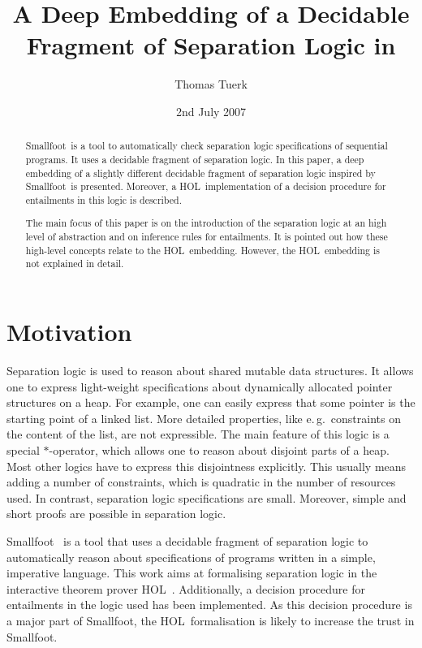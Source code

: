 \documentclass{scrartcl}
\title{A Deep Embedding of a Decidable Fragment of Separation Logic in \HOL}
\author{Thomas Tuerk}
\date{2nd July 2007}
\theoremstyle{definition}
\newcommand{\smallfoot}{{\sf Smallfoot}}
\newcommand{\HOL}{{\sf HOL}}
\begin{document}
\maketitle

\begin{abstract}
  \smallfoot\ is a tool to automatically check separation logic specifications
  of sequential programs. It uses a decidable fragment of separation logic. In
  this paper, a deep embedding of a slightly different decidable fragment of
  separation logic inspired by \smallfoot\ is presented. Moreover, a \HOL\ 
  implementation of a decision procedure for entailments in this logic is
  described.

  The main focus of this paper is on the introduction of the separation
  logic at an high level of abstraction and on inference rules for
  entailments. It is pointed out how these high-level concepts relate to
  the \HOL\ embedding. However, the \HOL\ embedding is not explained in detail.
\end{abstract}


\tableofcontents 


\section{Motivation}
Separation logic \cite{reynolds02separation} is used to reason about shared
mutable data structures. It allows one to express light-weight specifications
about dynamically allocated pointer structures on a heap. For example, one can
easily express that some pointer is the starting point of a linked list. More
detailed properties, like e.\,g.\ constraints on the content of the list, are
not expressible. The main feature of this logic is a special $*$-operator,
which allows one to reason about disjoint parts of a heap.  Most other logics have
to express this disjointness explicitly. This usually means adding a number of
constraints, which is quadratic in the number of resources used. In contrast,
separation logic specifications are small. Moreover, simple and
short proofs are possible in separation logic.

\smallfoot~\cite{BerdineCO05} is a tool that uses a decidable fragment of
separation logic to automatically reason about specifications of programs
written in a simple, imperative language.  This work aims at formalising 
separation logic in the interactive theorem prover \HOL~\cite{GoMe93}.
Additionally, a decision procedure for entailments in the logic used has been
implemented. As this decision procedure is a major part of \smallfoot, the
\HOL\ formalisation is likely to increase the trust in \smallfoot.
\end{document}
